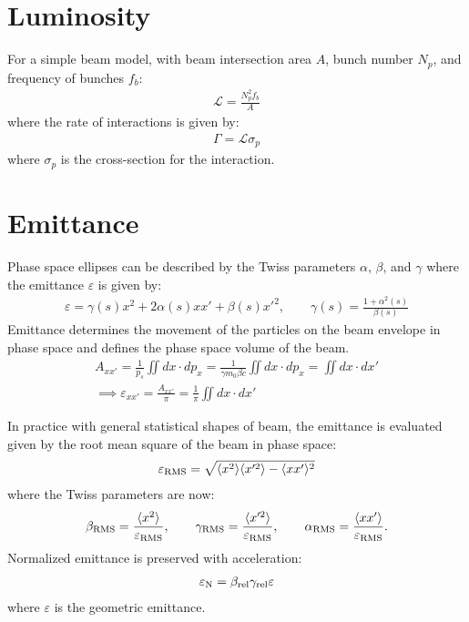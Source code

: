 \documentclass{article}
\numberwithin{equation}{section}
\begin{document}
\section{Luminosity}

For a simple beam model, with beam intersection area $A$, bunch number $N_p$, and frequency of bunches $f_b$:
\begin{align}
\mathcal{L} = \frac{N_p^2 f_b}{A}
\end{align}
where the rate of interactions is given by:
\begin{align}
\Gamma = \mathcal{L} \sigma_p
\end{align}
where $\sigma_p$ is the cross-section for the interaction.

\section{Emittance}

Phase space ellipses can be described by the Twiss parameters $\alpha$, $\beta$, and $\gamma$ where the emittance $\varepsilon$ is given by:
\begin{align}
\varepsilon = \gamma(s)x^2 + 2 \alpha(s)x x' + \beta(s) x'^2, \qquad \gamma(s) = \frac{1+\alpha^2(s)}{\beta(s)}
\end{align}
Emittance determines the movement of the particles on the beam envelope in phase space and defines the phase space volume of the beam.
\begin{align}
A_{xx'} = \frac{1}{p_s}\iint dx \cdot dp_x = \frac{1}{\gamma m_0 \beta c} \iint d x \cdot dp_x = \iint dx \cdot dx' \\
\implies \varepsilon_{xx'} = \frac{A_{xx'}}{\pi} = \frac{1}{\pi}\iint dx \cdot dx'
\end{align}

In practice with general statistical shapes of beam, the emittance is evaluated given by the root mean square of the beam in phase space:
\begin{align}
\varepsilon_{\rm RMS} = \sqrt{\langle x^2 \rangle \langle x'^2 \rangle- \langle xx' \rangle^2}
\end{align}
where the Twiss parameters are now:
\begin{align}
\beta_{\rm RMS} = \frac{\langle x^2 \rangle}{\varepsilon_{\rm RMS}}, \qquad
\gamma_{\rm RMS} = \frac{\langle x'^2 \rangle}{\varepsilon_{\rm RMS}}, \qquad
\alpha_{\rm RMS} = \frac{\langle x x' \rangle}{\varepsilon_{\rm RMS}}.
\end{align}
Normalized emittance is preserved with acceleration:
\begin{align}
\varepsilon_{\rm N} = \beta_{\rm rel} \gamma_{\rm rel} \varepsilon
\end{align}
where $\varepsilon$ is the geometric emittance.
\end{document}
